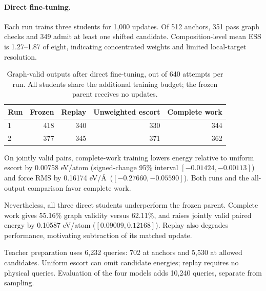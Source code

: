\paragraph{Direct fine-tuning.}
Each run trains three students for 1,000 updates. Of 512 anchors, 351 pass graph checks and 349 admit at least one shifted candidate. Composition-level mean ESS is 1.27--1.87 of eight, indicating concentrated weights and limited local-target resolution.

\begin{table}[t]
\centering
\caption{Graph-valid outputs after direct fine-tuning, out of 640 attempts per run. All students share the additional training budget; the frozen parent receives no updates.}
\begin{tabular}{lrrrr}
\toprule
Run & Frozen & Replay & Unweighted escort & Complete work\\
\midrule
1 &418&340&330&344\\
2 &377&345&371&362\\
\bottomrule
\end{tabular}\label{tab:local-work-direct}
\end{table}

On jointly valid pairs, complete-work training lowers energy relative to uniform escort by 0.00758 eV/atom (signed-change 95\% interval $[-0.01424,-0.00113]$) and force RMS by 0.16174 eV/\AA\ ($[-0.27660,-0.05590]$). Both runs and the all-output comparison favor complete work.

Nevertheless, all three direct students underperform the frozen parent. Complete work gives 55.16\% graph validity versus 62.11\%, and raises jointly valid paired energy by 0.10587 eV/atom ($[0.09009,0.12168]$). Replay also degrades performance, motivating subtraction of its matched update.

Teacher preparation uses 6,232 queries: 702 at anchors and 5,530 at allowed candidates. Uniform escort can omit candidate energies; replay requires no physical queries. Evaluation of the four models adds 10,240 queries, separate from sampling.
